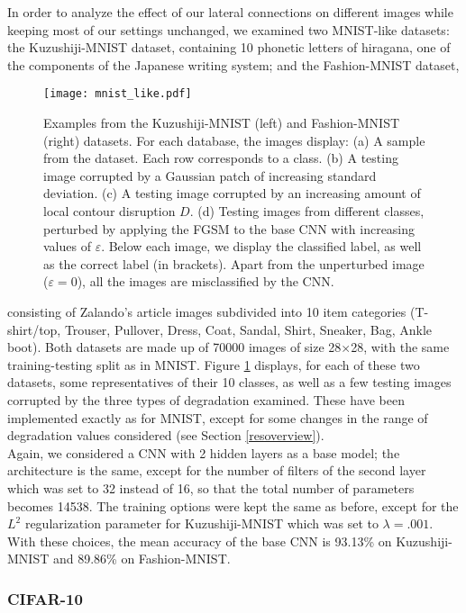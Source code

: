 \documentclass[11pt,oneside,reqno]{amsart}
\begin{document}
 In order to analyze the effect of our lateral connections on different images while keeping most of our settings unchanged, we examined two MNIST-like datasets: the Kuzushiji-MNIST dataset, containing 10 phonetic letters of hiragana, one of the components of the Japanese writing system; and the Fashion-MNIST dataset,  
 \begin{figure}[htbp!]
  \centering
 \texttt{[image: mnist\_like.pdf]}
 \caption{Examples from the Kuzushiji-MNIST (left) and Fashion-MNIST (right) datasets. For each database, the images display: (a) A sample from the dataset. Each row corresponds to a class. (b) A testing image corrupted by a Gaussian patch of increasing standard deviation. (c) A testing image corrupted by an increasing amount of local contour disruption $D$. (d) Testing images from different classes, perturbed by applying the FGSM to the base CNN with increasing values of $\varepsilon$. Below each image, we display the classified label, as well as the correct label (in brackets). Apart from the unperturbed image ($\varepsilon=0$), all the images are misclassified by the CNN.}\label{mnist_like}
 \end{figure} 
 consisting of Zalando's article images subdivided into 10 item categories (T-shirt/top, Trouser, Pullover, Dress, Coat, Sandal, Shirt, Sneaker, Bag, Ankle boot). Both datasets are made up of 70000 images of size 28$\times$28, with the same training-testing split as in MNIST. Figure \ref{mnist_like} displays, for each of these two datasets, some representatives of their 10 classes, as well as a few testing images corrupted by the three types of degradation examined. These have been implemented exactly as for MNIST, except for some changes in the range of degradation values considered (see Section \ref{resoverview}).\\
 Again, we considered a CNN with 2 hidden layers as a base model; the architecture is the same, except for the number of filters of the second layer which was set to 32 instead of 16, so that the total number of parameters becomes 14538. The training options were kept the same as before, except for the $L^2$ regularization parameter for Kuzushiji-MNIST which was set to $\lambda=.001$. With these choices, the mean accuracy of the base CNN is 93.13\% on Kuzushiji-MNIST and 89.86\% on Fashion-MNIST.
 
 
 \subsubsection{CIFAR-10}
\end{document}

